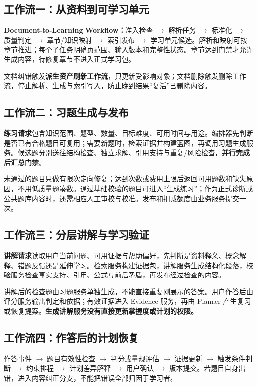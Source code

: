 \documentclass[UTF8,a4paper,11pt,fontset=none]{ctexart}
\newcommand{\cont}[1]{\clearpage\noindent{\small\sffamily\color{Muted}#1}\par\vspace{3pt}}
\begin{document}
\cont{9 / 微服务架构与业务编排（续）}
\subsection{工作流一：从资料到可学习单元}
\textbf{Document-to-Learning Workflow：}准入检查 $\rightarrow$ 解析任务 $\rightarrow$ 标准化 $\rightarrow$ 质量判定 $\rightarrow$ 章节/知识映射 $\rightarrow$ 索引发布 $\rightarrow$ 学习单元候选。解析和映射可按章节推进；每个子任务明确页范围、输入版本和完整性状态。章节达到门禁才允许生成内容，待修复章节不进入正式学习包。

文档纠错触发\textbf{派生资产刷新工作流}，只更新受影响对象；文档删除触发删除工作流，停止解析、生成与索引写入，防止晚到结果“复活”已删除内容。

\subsection{工作流二：习题生成与发布}
\textbf{练习请求}包含知识范围、题型、数量、目标难度、可用时间与用途。编排器先判断是否已有合格题目可复用；需要新题时，检索证据并构建蓝图，再调用习题生成服务。候选题分别送往结构检查、独立求解、引用支持与重复/风险检查，\textbf{并行完成后汇总门禁}。

未通过的题目只做有限次定向修复；达到次数或费用上限后返回可用题数和缺失原因，不用低质量题凑数。通过基础校验的题目可进入“生成练习”；作为正式诊断或公共题库内容时，还需相应人工审校与校准。发布和扣减额度由业务服务提交一次。

\subsection{工作流三：分层讲解与学习验证}
\textbf{讲解请求}读取用户当前问题、可用证据与帮助偏好，先判断是资料释义、概念解释、错题反馈还是延伸学习。检索服务构建证据包，讲解服务生成结构化段落，校验服务检查事实支持、引用、公式与前后矛盾，再发布经过检查的内容。

讲解后的检查题由习题服务单独生成，不能直接重复刚展示的答案。用户作答后由评分服务输出判定和依据；有效证据进入 Evidence 服务，再由 Planner 产生复习或恢复提案。\textbf{生成讲解服务没有直接更新掌握度或计划的权限。}

\subsection{工作流四：作答后的计划恢复}
作答事件 $\rightarrow$ 题目有效性检查 $\rightarrow$ 判分或量规评估 $\rightarrow$ 证据更新 $\rightarrow$ 触发条件判断 $\rightarrow$ 约束排程 $\rightarrow$ 计划差异解释 $\rightarrow$ 用户确认 $\rightarrow$ 版本提交。若题目自身出错，进入内容纠正分支，不能把错误全部归因于学习者。
\end{document}
